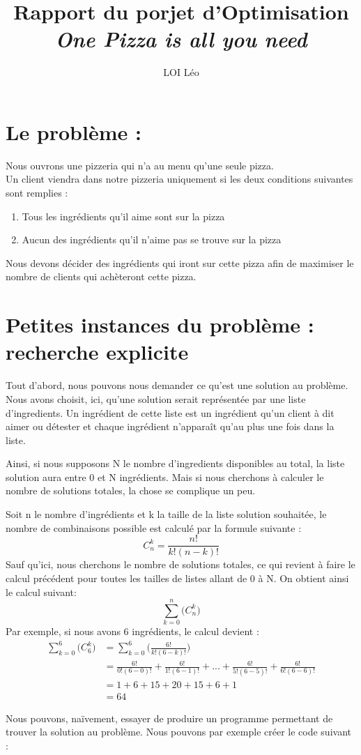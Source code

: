 \documentclass{article}
\title{Rapport du porjet d'Optimisation\newline
    \textit{One Pizza is all you need}}
\author{LOI Léo}
\begin{document}
\maketitle

\tableofcontents
\newpage

\section{Le problème :}

Nous ouvrons une pizzeria qui n'a au menu qu'une seule pizza.\\
Un client viendra dans notre pizzeria uniquement si les deux conditions suivantes sont remplies :
\begin{enumerate}
    \item Tous les ingrédients qu'il aime sont sur la pizza
    \item Aucun des ingrédients qu'il n'aime pas se trouve sur la pizza
\end{enumerate}
Nous devons décider des ingrédients qui iront sur cette pizza afin de maximiser le nombre de clients qui achèteront cette pizza.

\section{Petites instances du problème : recherche explicite}

Tout d'abord, nous pouvons nous demander ce qu'est une solution au problème.\newline
Nous avons choisit, ici, qu'une solution serait représentée par une liste d'ingredients.
Un ingrédient de cette liste est un ingrédient qu'un client à dit aimer ou détester et chaque ingrédient n'apparaît qu'au plus une fois dans la liste.

Ainsi, si nous supposons N le nombre d'ingredients disponibles au total, la liste solution aura entre 0 et N ingrédients.\newline
Mais si nous cherchons à calculer le nombre de solutions totales, la chose se complique un peu.

Soit n le nombre d'ingrédients et k la taille de la liste solution souhaitée, le nombre de combinaisons possible est calculé par la formule suivante :
$$C_{n}^{k}=\frac{n!}{k!(n-k)!}$$
Sauf qu'ici, nous cherchons le nombre de solutions totales, ce qui revient à faire le calcul précédent pour toutes les tailles de listes allant de 0 à N.\newline
On obtient ainsi le calcul suivant:
$$\sum_{k=0}^{n}\bigl(C_{n}^{k}\bigr)$$
Par exemple, si nous avons 6 ingrédients, le calcul devient :
\begin{align*}
    \sum_{k=0}^{6}\bigl(C_{6}^{k}\bigr)&=\sum_{k=0}^{6}\bigl(\frac{6!}{k!(6-k)!}\bigr)\\
    &=\frac{6!}{0!(6-0)!}+\frac{6!}{1!(6-1)!}+...+\frac{6!}{5!(6-5)!}+\frac{6!}{6!(6-6)!}\\
    &= 1 + 6 + 15 + 20 + 15 + 6 + 1\\
    &=64
\end{align*}

Nous pouvons, naïvement, essayer de produire un programme permettant de trouver la solution au problème.\newline
Nous pouvons par exemple créer le code suivant : 

\end{document}
